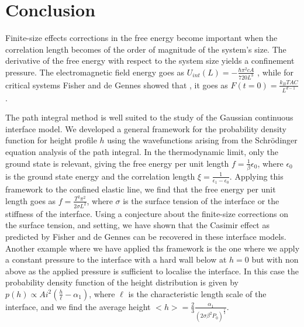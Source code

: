 \section{Conclusion}

Finite-size effects corrections in the free energy become important when the correlation length becomes of the order of magnitude of the system's size. The derivative of the free energy with respect to the system size yields a confinement pressure. The electromagnetic field energy goes as $U_{int}(L) = -\frac{\hbar \pi^2 c A}{720 L^3}$ \cite{h_b_g_casimir_attraction_1948,sm_rytov_principles_1989,lifshits_theory_1955}, while for critical systems Fisher and de Gennes showed that  \cite{amit_field_2005}, it goes as $F(t=0) = \frac{k_B T A C}{L^{d-1}}$ \cite{gambassi_casimir_2009}.

The path integral method \cite{matsubara_new_1955} is well suited to the study of the Gaussian continuous interface model. We developed a general framework for the probability density function for height profile $h$ using the wavefunctions arising from the Schr\"odinger equation analysis of the path integral. In the thermodynamic limit, only the ground state  is relevant, giving the free energy per unit length $f= \frac{1}{\beta}\epsilon_0$, where $\epsilon_0$ is the ground state energy and the correlation length $\xi = \frac{1}{\epsilon_1-\epsilon_0}$. 
Applying this framework to the confined elastic line, we find that the free energy per unit length goes as $f = \frac{T^2 \pi^2}{2 \sigma L^2}$, where $\sigma$ is the surface tension of the interface or the stiffness of the interface. Using a conjecture \cite{privman_finite-size_1988-1} about the finite-size corrections on the surface tension, and setting, we have shown that the Casimir effect as predicted by Fisher and de Gennes can be recovered in these interface models. 
Another example where we have applied ths framework is the one where we apply a constant pressure to the interface with a hard wall below at $h=0$ but with non above as the applied pressure is sufficient to localise the interface. In this case the probability density function of the height distribution is given by $p(h) \propto Ai^2(\frac{h}{\ell}-\alpha_1)$, where $\ell$ is the characteristic length scale of the interface, and we  find the average height $<h> = \frac{2}{3}\frac{\alpha_1}{\left(2\sigma \beta^2 P_0 \right)^\frac{1}{3}}$.

